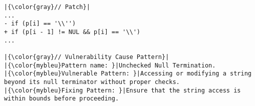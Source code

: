 \begin{lstlisting}[style=diff, caption={Fixing diff and vulnerability cause pattern for CVE-2022-1733}, label={lst:vuln_pattern}]
|{\color{gray}// Patch}|
...
- if (p[i] == '\\'')  
+ if (p[i - 1] != NUL && p[i] == '\\')
...

|{\color{gray}// Vulnerability Cause Pattern}|
|{\color{mybleu}Pattern name: }|Unchecked Null Termination.
|{\color{mybleu}Vulnerable Pattern: }|Accessing or modifying a string beyond its null terminator without proper checks.
|{\color{mybleu}Fixing Pattern: }|Ensure that the string access is within bounds before proceeding.
\end{lstlisting}
